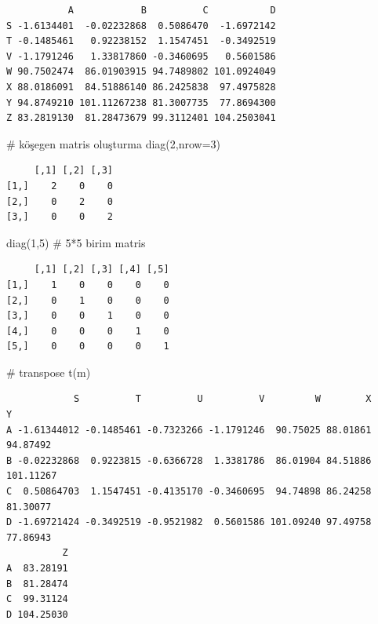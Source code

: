 \documentclass[
  letterpaper,
  DIV=11,
  numbers=noendperiod]{scrreprt}
\newenvironment{Shaded}{\begin{snugshade}}{\end{snugshade}}
\newcommand{\AttributeTok}[1]{\textcolor[rgb]{0.40,0.45,0.13}{#1}}
\newcommand{\CommentTok}[1]{\textcolor[rgb]{0.37,0.37,0.37}{#1}}
\newcommand{\DecValTok}[1]{\textcolor[rgb]{0.68,0.00,0.00}{#1}}
\newcommand{\FunctionTok}[1]{\textcolor[rgb]{0.28,0.35,0.67}{#1}}
\newcommand{\NormalTok}[1]{\textcolor[rgb]{0.00,0.23,0.31}{#1}}
\begin{document}
\begin{verbatim}
           A            B          C           D
S -1.6134401  -0.02232868  0.5086470  -1.6972142
T -0.1485461   0.92238152  1.1547451  -0.3492519
V -1.1791246   1.33817860 -0.3460695   0.5601586
W 90.7502474  86.01903915 94.7489802 101.0924049
X 88.0186091  84.51886140 86.2425838  97.4975828
Y 94.8749210 101.11267238 81.3007735  77.8694300
Z 83.2819130  81.28473679 99.3112401 104.2503041
\end{verbatim}

\begin{Shaded}
\begin{Highlighting}[]
\CommentTok{\# köşegen matris oluşturma}
\FunctionTok{diag}\NormalTok{(}\DecValTok{2}\NormalTok{,}\AttributeTok{nrow=}\DecValTok{3}\NormalTok{)}
\end{Highlighting}
\end{Shaded}

\begin{verbatim}
     [,1] [,2] [,3]
[1,]    2    0    0
[2,]    0    2    0
[3,]    0    0    2
\end{verbatim}

\begin{Shaded}
\begin{Highlighting}[]
\FunctionTok{diag}\NormalTok{(}\DecValTok{1}\NormalTok{,}\DecValTok{5}\NormalTok{) }\CommentTok{\# 5*5 birim matris}
\end{Highlighting}
\end{Shaded}

\begin{verbatim}
     [,1] [,2] [,3] [,4] [,5]
[1,]    1    0    0    0    0
[2,]    0    1    0    0    0
[3,]    0    0    1    0    0
[4,]    0    0    0    1    0
[5,]    0    0    0    0    1
\end{verbatim}

\begin{Shaded}
\begin{Highlighting}[]
\CommentTok{\# transpose}
\FunctionTok{t}\NormalTok{(m)}
\end{Highlighting}
\end{Shaded}

\begin{verbatim}
            S          T          U          V         W        X         Y
A -1.61344012 -0.1485461 -0.7323266 -1.1791246  90.75025 88.01861  94.87492
B -0.02232868  0.9223815 -0.6366728  1.3381786  86.01904 84.51886 101.11267
C  0.50864703  1.1547451 -0.4135170 -0.3460695  94.74898 86.24258  81.30077
D -1.69721424 -0.3492519 -0.9521982  0.5601586 101.09240 97.49758  77.86943
          Z
A  83.28191
B  81.28474
C  99.31124
D 104.25030
\end{verbatim}
\end{document}

